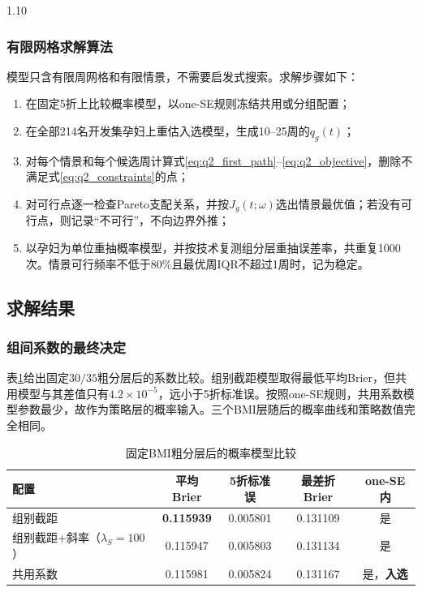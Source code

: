 \documentclass[12pt,a4paper]{ctexrep}
\numberwithin{equation}{section}
\begin{document}
\begin{spacing}{1.10}
{			\subsubsection{有限网格求解算法}
			模型只含有限周网格和有限情景，不需要启发式搜索。求解步骤如下：
			\begin{enumerate}[label=\arabic*),itemsep=0pt,topsep=2pt]
			\item 在固定5折上比较概率模型，以one-SE规则冻结共用或分组配置；
			\item 在全部214名开发集孕妇上重估入选模型，生成10--25周的$q_g(t)$；
			\item 对每个情景和每个候选周计算式\eqref{eq:q2_first_path}--\eqref{eq:q2_objective}，删除不满足式\eqref{eq:q2_constraints}的点；
			\item 对可行点逐一检查Pareto支配关系，并按$J_g(t;\omega)$选出情景最优值；若没有可行点，则记录“不可行”，不向边界外推；
			\item 以孕妇为单位重抽概率模型，并按技术复测组分层重抽误差率，共重复1000次。情景可行频率不低于$80\%$且最优周IQR不超过1周时，记为稳定。
			\end{enumerate}

			\subsection{求解结果}
			\subsubsection{组间系数的最终决定}
			表\ref{tab:q2_model_selection}给出固定$30/35$粗分层后的系数比较。组别截距模型取得最低平均Brier，但共用模型与其差值只有$4.2\times10^{-5}$，远小于5折标准误。按照one-SE规则，共用系数模型参数最少，故作为策略层的概率输入。三个BMI层随后的概率曲线和策略数值完全相同。

			\begin{table}[H]
			\centering
			\footnotesize
			\renewcommand{\arraystretch}{1.15}
			\caption{固定BMI粗分层后的概率模型比较}
			\label{tab:q2_model_selection}
			\begin{tabular}{lcccc}
			\toprule
			配置 & 平均Brier & 5折标准误 & 最差折Brier & one-SE内 \\
			\midrule
			组别截距 & \textbf{0.115939} & 0.005801 & 0.131109 & 是 \\
			组别截距+斜率（$\lambda_S=100$） & 0.115947 & 0.005803 & 0.131134 & 是 \\
			共用系数 & 0.115981 & 0.005824 & 0.131167 & 是，\textbf{入选} \\
			\bottomrule
			\end{tabular}
			\end{table}

}
\end{spacing}
\end{document}

